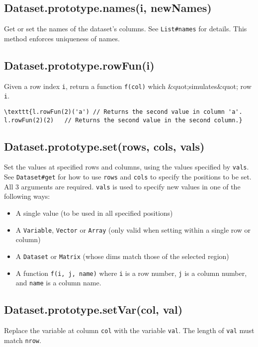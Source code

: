 \documentclass{article}
\begin{document}
    \subsection{Dataset.prototype.names(i, newNames)}
    Get or set the names of the dataset's columns. See \texttt{List\#names} for
details. This method enforces uniqueness of names.


    \subsection{Dataset.prototype.rowFun(i)}
    Given a row index \texttt{i}, return a function \texttt{f(col)} which \&quot;simulates\&quot; row \texttt{i}.


\begin{lstlisting}
\texttt{l.rowFun(2)('a') // Returns the second value in column 'a'.
l.rowFun(2)(2)   // Returns the second value in the second column.}\end{lstlisting}

    \subsection{Dataset.prototype.set(rows, cols, vals)}
    Set the values at specified rows and columns, using the values specified by
\texttt{vals}. See \texttt{Dataset\#get} for how to use \texttt{rows} and \texttt{cols} to specify the
positions to be set. All 3 arguments are required.
\texttt{vals} is used to specify new values in one of the following ways:


\begin{itemize}

\item A single value (to be used in all specified positions)

\item A \texttt{Variable}, \texttt{Vector} or \texttt{Array} (only valid when setting within a single
row or column)

\item A \texttt{Dataset} or \texttt{Matrix} (whose dims match those of the selected region)

\item A function \texttt{f(i, j, name)} where \texttt{i} is a row number, \texttt{j} is a column number,
and \texttt{name} is a column name.

\end{itemize}

    \subsection{Dataset.prototype.setVar(col, val)}
    Replace the variable at column \texttt{col} with the variable \texttt{val}. The length
of \texttt{val} must match \texttt{nrow}.
\end{document}

